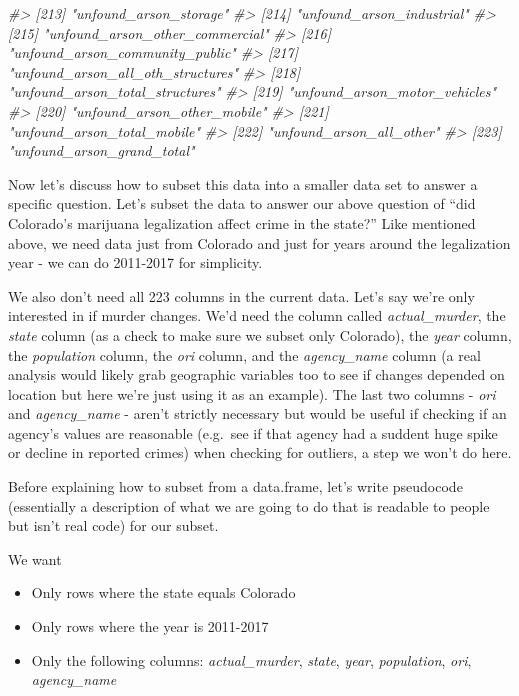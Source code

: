 \documentclass[
]{krantz}
\makeatletter
\newenvironment{Shaded}{\begin{snugshade}}{\end{snugshade}}
\newcommand{\CommentTok}[1]{\textcolor[rgb]{0.37,0.37,0.37}{\textit{#1}}}
\providecommand{\tightlist}{%
  \setlength{\itemsep}{0pt}\setlength{\parskip}{0pt}}
\newenvironment{kframe}{%
\medskip{}
\setlength{\fboxsep}{.8em}
 \def\at@end@of@kframe{}%
 \ifinner\ifhmode%
  \def\at@end@of@kframe{\end{minipage}}%
  \begin{minipage}{\columnwidth}%
 \fi\fi%
 \def\FrameCommand##1{\hskip\@totalleftmargin \hskip-\fboxsep
 \colorbox{shadecolor}{##1}\hskip-\fboxsep
     \hskip-\linewidth \hskip-\@totalleftmargin \hskip\columnwidth}%
 \MakeFramed {\advance\hsize-\width
   \@totalleftmargin\z@ \linewidth\hsize
   \@setminipage}}%
 {\par\unskip\endMakeFramed%
 \at@end@of@kframe}
\renewenvironment{Shaded}{\begin{kframe}}{\end{kframe}}
\makeatother
\begin{document}
\begin{Shaded}
\begin{Highlighting}[]
\CommentTok{\#\textgreater{} [213] "unfound\_arson\_storage"           }
\CommentTok{\#\textgreater{} [214] "unfound\_arson\_industrial"        }
\CommentTok{\#\textgreater{} [215] "unfound\_arson\_other\_commercial"  }
\CommentTok{\#\textgreater{} [216] "unfound\_arson\_community\_public"  }
\CommentTok{\#\textgreater{} [217] "unfound\_arson\_all\_oth\_structures"}
\CommentTok{\#\textgreater{} [218] "unfound\_arson\_total\_structures"  }
\CommentTok{\#\textgreater{} [219] "unfound\_arson\_motor\_vehicles"    }
\CommentTok{\#\textgreater{} [220] "unfound\_arson\_other\_mobile"      }
\CommentTok{\#\textgreater{} [221] "unfound\_arson\_total\_mobile"      }
\CommentTok{\#\textgreater{} [222] "unfound\_arson\_all\_other"         }
\CommentTok{\#\textgreater{} [223] "unfound\_arson\_grand\_total"}
\end{Highlighting}
\end{Shaded}

Now let's discuss how to subset this data into a smaller data set to answer a specific question. Let's subset the data to answer our above question of ``did Colorado's marijuana legalization affect crime in the state?'' Like mentioned above, we need data just from Colorado and just for years around the legalization year - we can do 2011-2017 for simplicity.

We also don't need all 223 columns in the current data. Let's say we're only interested in if murder changes. We'd need the column called \emph{actual\_murder}, the \emph{state} column (as a check to make sure we subset only Colorado), the \emph{year} column, the \emph{population} column, the \emph{ori} column, and the \emph{agency\_name} column (a real analysis would likely grab geographic variables too to see if changes depended on location but here we're just using it as an example). The last two columns - \emph{ori} and \emph{agency\_name} - aren't strictly necessary but would be useful if checking if an agency's values are reasonable (e.g.~see if that agency had a suddent huge spike or decline in reported crimes) when checking for outliers, a step we won't do here.

Before explaining how to subset from a data.frame, let's write pseudocode (essentially a description of what we are going to do that is readable to people but isn't real code) for our subset.

We want

\begin{itemize}
\tightlist
\item
  Only rows where the state equals Colorado
\item
  Only rows where the year is 2011-2017
\item
  Only the following columns: \emph{actual\_murder}, \emph{state}, \emph{year}, \emph{population}, \emph{ori}, \emph{agency\_name}
\end{itemize}
\end{document}

